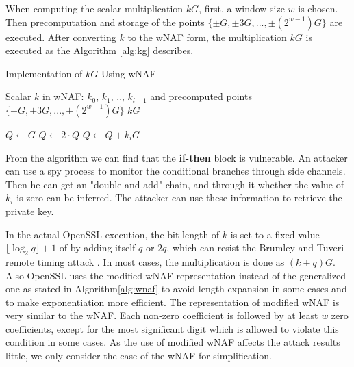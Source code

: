 When computing the scalar multiplication $kG$,
first, a window size $w$ is chosen.
Then precomputation and storage of the points $\{\pm G, \pm 3G, ..., \pm(2^{w - 1})G\}$ are executed.
After converting $k$ to the wNAF form, the multiplication $kG$ is executed as the Algorithm \ref{alg:kg} describes.


\renewcommand{\algorithmicrequire}{\textbf{Input:}}
\renewcommand{\algorithmicensure}{\textbf{Output:}}

 \begin{algorithm}[b]
        \caption{Implementation of $kG$ Using wNAF}
        \label{alg:kg}
        \begin{algorithmic}[1]
            \Require Scalar $k$ in wNAF: $k_0$, $k_1$, .., $k_{l-1}$ and precomputed points $\{\pm G, \pm 3G, ..., \pm(2^{w - 1})G\}$
            \Ensure $kG$

            \State $Q \gets G$
                \State $Q \gets 2\cdot Q$
                    \State $Q \gets Q + k_{i}G$
                \EndIf
            \EndFor
        \end{algorithmic}
    \end{algorithm}

From the algorithm we can find that the \textbf{if-then} block is vulnerable.
An attacker can use a spy process to monitor the conditional branches through side channels.
Then he can get an "double-and-add" chain, and through it whether the value of $k_i$ is zero can be inferred.
The attacker can use these information to retrieve the private key.

In the actual OpenSSL execution, the bit length of $k$ is set to a fixed value$\lfloor\log_{2}{q}\rfloor + 1$ of by adding itself $q$
or $2q$, which can resist the Brumley and Tuveri remote timing attack \cite{Brumley2011}.
In most cases, the multiplication is done as $(k + q)G$.
Also OpenSSL uses the modified wNAF representation instead of the generalized one as stated in Algorithm\ref{alg:wnaf} to avoid length expansion in some cases and to make exponentiation more efficient.
The representation of modified wNAF is very similar to the wNAF.
Each non-zero coefficient is followed by at least $w$ zero coefficients,
 except for the most significant digit which is allowed to violate this condition in some cases.
As the use of modified wNAF affects the attack results little,
 we only consider the case of the wNAF for simplification. %


